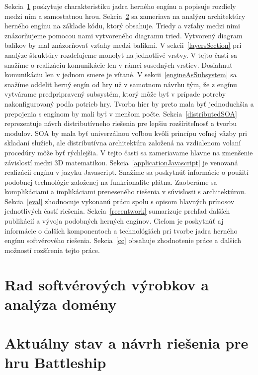 \documentclass[11pt,slovak,a4paper,twoside]{article}
\begin{document}
Sekcia~\ref{insight} poskytuje charakteristiku jadra herného engínu a popisuje rozdiely medzi ním a samostatnou hrou.
Sekcia~\ref{analysis} sa zameriava na analýzu architektúry herného engínu na základe kódu, ktorý obsahuje. Triedy a vz\v{t}ahy medzi nimi znázor\v{n}ujeme pomocou nami vytvoreného diagramu tried. Vytvorený diagram balíkov by mal znázor\v{n}ova\v{t} vz\v{t}ahy medzi balíkmi.  
V sekcii~\ref{layersSection} pri analýze \v{s}truktúry rozde\v{l}ujeme monolyt na jednotlivé vrstvy. V tejto \v{c}asti sa sna\v{z}íme o realizáciu komunikácie len v rámci susedných vrstiev. Dosiahnu\v{t} komunikáciu len v jednom smere je vítané.
V sekcii~\ref{engineAsSubsystem} sa sna\v{z}íme oddeli\v{t} herný engín od hry u\v{z} v samotnom návrhu tým, \v{z}e z engínu vytvárame predpripravený subsystém, ktorý mô\v{z}e by\v{t} v prípade potreby nakonfigurovaný pod\v{l}a potrieb hry. Tvorba hier by preto mala by\v{t} jednoduch\v{s}ia a prepojenia s engínom by mali by\v{t} v men\v{s}om po\v{c}te. 
Sekcia~\ref{distributedSOA} reprezentuje návrh distributívneho rie\v{s}enia pre lep\v{s}iu roz\v{s}írite\v{l}nos\v{t} a tvorbu modulov. SOA by mala byť univerzálnou vo\v{l}bou kvôli princípu vo\v{l}nej väzby pri skladaní slu\v{z}ieb, ale distributívna architektúra zalo\v{z}ená na vzdialenom volaní procedúry mô\v{z}e by\v{t} rýchlej\v{s}ia. V tejto \v{c}asti sa zameriavame hlavne na zmen\v{s}enie závislostí medzi 3D matematikou.
Sekcia~\ref{applicationJavascript} je venovaná realizácii engínu v jazyku Javascript. Sna\v{z}íme sa poskytnú\v{t} informácie o pou\v{z}ití podobnej technológie zalo\v{z}enej na funkcionalite plátna. Zaoberáme sa komplikáciami a implikáciami preneseného rie\v{s}enia v súvislosti s architektúrou.
Sekcia~\ref{eval} zhodnocuje vykonanú prácu spolu s opisom hlavných prínosov jednotlivých \v{c}astí rie\v{s}enia.
Sekcia~\ref{recentwork} sumarizuje preh\v{l}ad \v{d}al\v{s}ích publikácií a vývoja podobných herných engínov. Cie\v{l}om je poskytnú\v{t} aj informácie o \v{d}al\v{s}ích komponentoch a technológiách pri tvorbe jadra herného engínu softvérového rie\v{s}enia.
Sekcia~\ref{cc} obsahuje zhodnotenie práce a \v{d}al\v{s}ích mo\v{z}ností roz\v{s}írenia tejto práce.


\section{Rad softvérových výrobkov a analýza domény} \label{insight}


\section{Aktuálny stav a návrh riešenia pre hru Battleship} \label{analysis}
\end{document}
